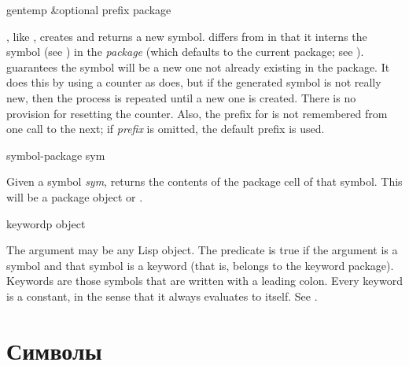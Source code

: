 \begin{defun}[Function]
gentemp &optional prefix package

, like , creates and returns a new symbol.
 differs from  in that it interns the symbol
(see ) in the \emph{package} (which defaults to the current
package; see ).   guarantees the symbol
will be a new one not already existing in the package.  It does this
by using a counter as  does, but if the generated symbol
is not really new, then the process is repeated until a new one is created.
There is no provision for resetting the  counter.
Also, the prefix for  is not remembered from one call
to the next; if \emph{prefix} is omitted, the default prefix  is used.
\end{defun}

\begin{defun}[Function]
symbol-package sym

Given a symbol \emph{sym},  returns the contents of the
package cell of that symbol.  This will be a package object or {\nil}.
\end{defun}

\begin{defun}[Function]
keywordp object

The argument may be any Lisp object.  The predicate  is true
if the argument is a symbol and that
symbol is a keyword (that is, belongs to the keyword
package).  Keywords are those symbols that are written with
a leading colon.  Every keyword is a constant, in the sense
that it always evaluates to itself.  See .
\end{defun}

\else

\chapter{Символы}
\label{symbol}

